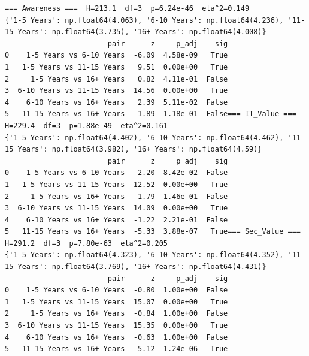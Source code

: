 {\tiny\begin{verbatim}
=== Awareness ===  H=213.1  df=3  p=6.24e-46  eta^2=0.149
{'1-5 Years': np.float64(4.063), '6-10 Years': np.float64(4.236), '11-15 Years': np.float64(3.735), '16+ Years': np.float64(4.008)}
                        pair      z     p_adj    sig
0    1-5 Years vs 6-10 Years  -6.09  4.58e-09   True
1   1-5 Years vs 11-15 Years   9.51  0.00e+00   True
2     1-5 Years vs 16+ Years   0.82  4.11e-01  False
3  6-10 Years vs 11-15 Years  14.56  0.00e+00   True
4    6-10 Years vs 16+ Years   2.39  5.11e-02  False
5   11-15 Years vs 16+ Years  -1.89  1.18e-01  False=== IT_Value ===  H=229.4  df=3  p=1.88e-49  eta^2=0.161
{'1-5 Years': np.float64(4.402), '6-10 Years': np.float64(4.462), '11-15 Years': np.float64(3.982), '16+ Years': np.float64(4.59)}
                        pair      z     p_adj    sig
0    1-5 Years vs 6-10 Years  -2.20  8.42e-02  False
1   1-5 Years vs 11-15 Years  12.52  0.00e+00   True
2     1-5 Years vs 16+ Years  -1.79  1.46e-01  False
3  6-10 Years vs 11-15 Years  14.09  0.00e+00   True
4    6-10 Years vs 16+ Years  -1.22  2.21e-01  False
5   11-15 Years vs 16+ Years  -5.33  3.88e-07   True=== Sec_Value ===  H=291.2  df=3  p=7.80e-63  eta^2=0.205
{'1-5 Years': np.float64(4.323), '6-10 Years': np.float64(4.352), '11-15 Years': np.float64(3.769), '16+ Years': np.float64(4.431)}
                        pair      z     p_adj    sig
0    1-5 Years vs 6-10 Years  -0.80  1.00e+00  False
1   1-5 Years vs 11-15 Years  15.07  0.00e+00   True
2     1-5 Years vs 16+ Years  -0.84  1.00e+00  False
3  6-10 Years vs 11-15 Years  15.35  0.00e+00   True
4    6-10 Years vs 16+ Years  -0.63  1.00e+00  False
5   11-15 Years vs 16+ Years  -5.12  1.24e-06   True
\end{verbatim}}

